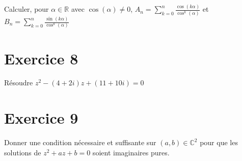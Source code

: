 \documentclass[11pt]{article}
\begin{document}
Calculer, pour $\alpha\in\mathbb{R}$ avec $\cos(\alpha)\neq 0$, $A_n=\sum_{k=0}^n \frac{\cos(k\alpha)}{\cos^k(\alpha)}$ et $B_n=\sum_{k=0}^n \frac{\sin(k\alpha)}{\cos^k(\alpha)}$

\section*{Exercice 8}

Résoudre $z^2 -(4+2i)z + (11+10i)=0$

\section*{Exercice 9}

Donner une condition nécessaire et suffisante sur $(a,b)\in\mathbb{C}^2$ pour que les solutions de $z^2 +az+b=0$ soient imaginaires pures.
\end{document}
